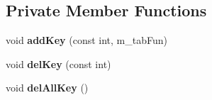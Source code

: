 \subsection*{Private Member Functions}
\begin{DoxyCompactItemize}
\item 
\hypertarget{class_load_state_a90c9c7fb21823d35331bbfeb19ecc017}{}void {\bfseries add\+Key} (const int, m\+\_\+tab\+Fun)\label{class_load_state_a90c9c7fb21823d35331bbfeb19ecc017}

\item 
\hypertarget{class_load_state_aab5d2f8c56edaef2890a65fefbff1686}{}void {\bfseries del\+Key} (const int)\label{class_load_state_aab5d2f8c56edaef2890a65fefbff1686}

\item 
\hypertarget{class_load_state_aa2baa900c32b847977eeed457525099d}{}void {\bfseries del\+All\+Key} ()\label{class_load_state_aa2baa900c32b847977eeed457525099d}

\end{DoxyCompactItemize}
